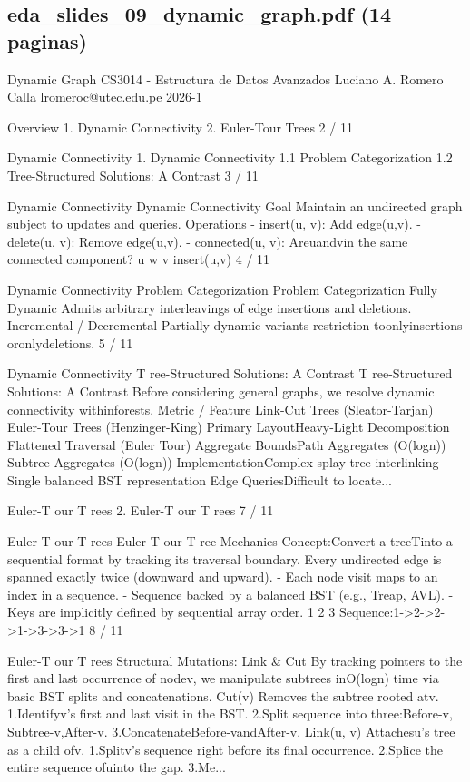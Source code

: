 \subsection*{eda\_slides\_09\_dynamic\_graph.pdf (14 paginas)}
\begin{description}[leftmargin=!,labelwidth=4.2em,style=nextline]
\item[Pag. 1] Dynamic Graph CS3014 - Estructura de Datos Avanzados Luciano A. Romero Calla lromeroc@utec.edu.pe 2026-1
\item[Pag. 2] Overview 1. Dynamic Connectivity 2. Euler-Tour Trees 2 / 11
\item[Pag. 3] Dynamic Connectivity 1. Dynamic Connectivity 1.1 Problem Categorization 1.2 Tree-Structured Solutions: A Contrast 3 / 11
\item[Pag. 4] Dynamic Connectivity Dynamic Connectivity Goal Maintain an undirected graph subject to updates and queries. Operations - insert(u, v): Add edge(u,v). - delete(u, v): Remove edge(u,v). - connected(u, v): Areuandvin the same connected component? u w v insert(u,v) 4 / 11
\item[Pag. 5] Dynamic Connectivity Problem Categorization Problem Categorization Fully Dynamic Admits arbitrary interleavings of edge insertions and deletions. Incremental / Decremental Partially dynamic variants restriction toonlyinsertions oronlydeletions. 5 / 11
\item[Pag. 6] Dynamic Connectivity T ree-Structured Solutions: A Contrast T ree-Structured Solutions: A Contrast Before considering general graphs, we resolve dynamic connectivity withinforests. Metric / Feature Link-Cut Trees (Sleator-Tarjan) Euler-Tour Trees (Henzinger-King) Primary LayoutHeavy-Light Decomposition Flattened Traversal (Euler Tour) Aggregate BoundsPath Aggregates (O(logn)) Subtree Aggregates (O(logn)) ImplementationComplex splay-tree interlinking Single balanced BST representation Edge QueriesDifficult to locate...
\item[Pag. 7] Euler-T our T rees 2. Euler-T our T rees 7 / 11
\item[Pag. 8] Euler-T our T rees Euler-T our T ree Mechanics Concept:Convert a treeTinto a sequential format by tracking its traversal boundary. Every undirected edge is spanned exactly twice (downward and upward). - Each node visit maps to an index in a sequence. - Sequence backed by a balanced BST (e.g., Treap, AVL). - Keys are implicitly defined by sequential array order. 1 2 3 Sequence:1->2->2->1->3->3->1 8 / 11
\item[Pag. 9] Euler-T our T rees Structural Mutations: Link \& Cut By tracking pointers to the first and last occurrence of nodev, we manipulate subtrees inO(logn) time via basic BST splits and concatenations. Cut(v) Removes the subtree rooted atv. 1.Identifyv's first and last visit in the BST. 2.Split sequence into three:Before-v, Subtree-v,After-v. 3.ConcatenateBefore-vandAfter-v. Link(u, v) Attachesu's tree as a child ofv. 1.Splitv's sequence right before its final occurrence. 2.Splice the entire sequence ofuinto the gap. 3.Me...

\end{description}
